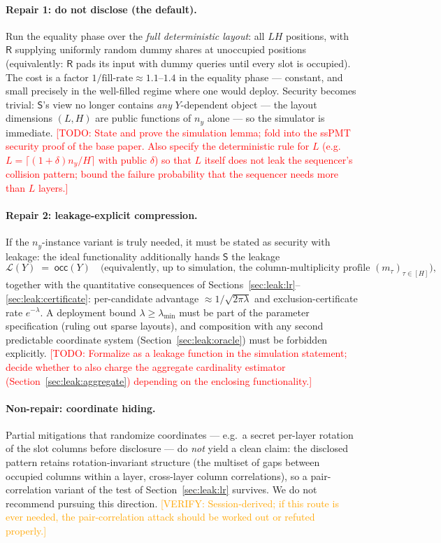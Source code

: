 \documentclass[runningheads]{llncs}
\newcommand{\TODO}[1]{\textcolor{red}{[TODO: #1]}}
\newcommand{\VERIFY}[1]{\textcolor{orange}{[VERIFY: #1]}}
\newcommand{\Snd}{\mathsf{S}}                %
\newcommand{\Rcv}{\mathsf{R}}                %
\newcommand{\half}{H}                        %
\newcommand{\occ}{\mathsf{occ}}
\begin{document}
\paragraph{Repair 1: do not disclose (the default).}
Run the equality phase over the \emph{full deterministic layout}: all $L\half$
positions, with $\Rcv$ supplying uniformly random dummy shares at unoccupied
positions (equivalently: $\Rcv$ pads its input with dummy queries until every slot
is occupied). The cost is a factor $1/\text{fill-rate}\approx1.1$--$1.4$ in the
equality phase --- constant, and small precisely in the well-filled regime where one
would deploy. Security becomes trivial: $\Snd$'s view no longer contains
\emph{any} $Y$-dependent object --- the layout dimensions $(L,\half)$ are public
functions of $n_y$ alone --- so the simulator is immediate.
\TODO{State and prove the simulation lemma; fold into the ssPMT security proof of
the base paper. Also specify the deterministic rule for $L$ (e.g.\
$L=\lceil(1+\delta)n_y/\half\rceil$ with public $\delta$) so that $L$ itself does
not leak the sequencer's collision pattern; bound the failure probability that the
sequencer needs more than $L$ layers.}

\paragraph{Repair 2: leakage-explicit compression.}
If the $n_y$-instance variant is truly needed, it must be stated as security with
leakage: the ideal functionality additionally hands $\Snd$ the leakage
\[
  \mathcal{L}(Y)\;=\;\occ(Y)
  \quad\big(\text{equivalently, up to simulation, the column-multiplicity profile }
  (m_\tau)_{\tau\in[\half]}\big),
\]
together with the quantitative consequences of
Sections~\ref{sec:leak:lr}--\ref{sec:leak:certificate}: per-candidate advantage
$\approx1/\sqrt{2\pi\lambda}$ and exclusion-certificate rate $e^{-\lambda}$. A
deployment bound $\lambda\ge\lambda_{\min}$ must be part of the parameter
specification (ruling out sparse layouts), and composition with any second
predictable coordinate system (Section~\ref{sec:leak:oracle}) must be forbidden
explicitly. \TODO{Formalize as a leakage function in the simulation statement;
decide whether to also charge the aggregate cardinality estimator
(Section~\ref{sec:leak:aggregate}) depending on the enclosing functionality.}

\paragraph{Non-repair: coordinate hiding.}
Partial mitigations that randomize coordinates --- e.g.\ a secret per-layer rotation
of the slot columns before disclosure --- do \emph{not} yield a clean claim: the
disclosed pattern retains rotation-invariant structure (the multiset of gaps between
occupied columns within a layer, cross-layer column correlations), so a
pair-correlation variant of the test of Section~\ref{sec:leak:lr} survives. We do
not recommend pursuing this direction. \VERIFY{Session-derived; if this route is
ever needed, the pair-correlation attack should be worked out or refuted properly.}
\end{document}
